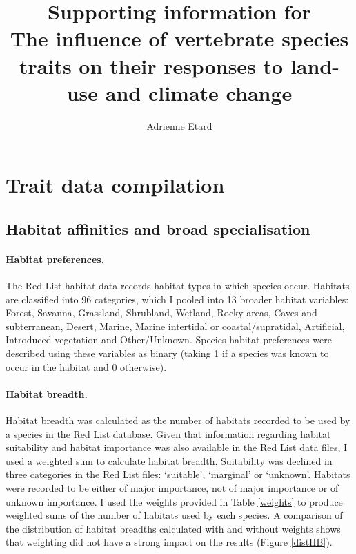 \documentclass[11pt]{article}
\begin{document}
\title{\textbf{Supporting information for\\
\vspace{1cm}
The influence of vertebrate species traits on their responses to land-use and climate change
\vspace{2cm}}}

\author{Adrienne Etard}

\maketitle

\clearpage
\tableofcontents


\clearpage
\listoftables

\clearpage
\listoffigures


\clearpage

\section{Trait data compilation}

\subsection{Habitat affinities and broad specialisation}
\paragraph{Habitat preferences.}
The Red List habitat data records habitat types in which species occur. Habitats are classified into 96 categories, which I pooled into 13 broader habitat variables: 
Forest, Savanna, Grassland, Shrubland, Wetland, Rocky areas, Caves and subterranean, Desert, Marine, Marine intertidal or coastal/supratidal, Artificial, Introduced vegetation and Other/Unknown. Species habitat preferences were described using these variables as binary (taking 1 if a species was known to occur in the habitat and 0 otherwise).
\paragraph{Habitat breadth.}
Habitat breadth was calculated as the number of habitats recorded to be used by a species in the Red List database. Given that information regarding habitat suitability and habitat importance was also available in the Red List data files, I used a weighted sum to calculate habitat breadth. Suitability was declined in three categories in the Red List files: `suitable', `marginal' or  `unknown'. Habitats were recorded to be either of major importance, not of major importance or of unknown importance. I used the weights provided in Table \ref{weights} to produce weighted sums of the number of habitats used by each species. A comparison of the distribution of habitat breadths calculated with and without weights shows that weighting did not have a strong impact on the results (Figure \ref{distHB}).
\end{document}
